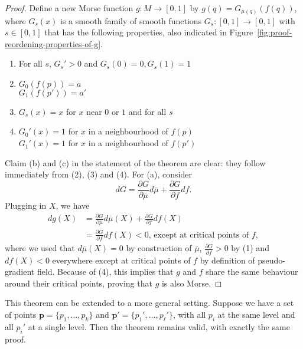 \begin{proof}
    Define a new Morse function $g: M \to  [0,1]$ by $g(q) = G_{\overline{\mu}(q)}(f(q))$, where $G_{s}(x)$ is a smooth family of smooth functions $G_s: [0,1] \to  [0,1]$ with $s \in [0,1]$ that has the following properties, also indicated in Figure~\ref{fig:proof-reordening-properties-of-g}.
    \begin{marginfigure}
        \centering
        \caption{Necessary properties of $G$ in the proof on reordering critical points are indicated in yellow.}
        \label{fig:proof-reordening-properties-of-g}
    \end{marginfigure}
    \begin{enumerate}[(1)]
        \item For all $s$, $G_s' > 0$ and $G_s(0) = 0, G_s(1) = 1$
        \item  $G_0(f(p)) = a$\\ $G_1(f(p')) = a'$
        \item  $G_s(x) = x$ for $x$ near  $0$ or  $1$ and for all $s$ 
        \item  $G_0'(x) = 1$ for $x$  in a neighbourhood of $f(p)$\\
        $G_1'(x) = 1$ for $x$  in a neighbourhood of $f(p')$
    \end{enumerate}
    Claim (b) and (c) in the statement of the theorem are clear: they follow immediately from (2), (3) and (4).
    For (a), consider
    \[
        dG = \frac{\partial G}{\partial \overline{\mu}}  d\overline{\mu} + \frac{\partial G}{\partial f}  df
    .\] 
    Plugging in $X$, we have
    \begin{align*}
        dg(X) &= \frac{\partial G}{\partial \overline{\mu}}  d\overline{\mu}(X) + \frac{\partial G}{\partial f}  df(X)\\
              &= \frac{\partial G}{\partial f}  df(X) < 0 \text{, except at critical points of $f$}
    ,\end{align*} 
    where we used that $d\overline{\mu}(X) = 0$ by construction of $\overline{\mu}$, $\frac{\partial G}{\partial f} > 0$ by (1) and $df(X) < 0$ everywhere except at critical points of $f$ by definition of pseudo-gradient field.
    Because of (4), this implies that $g$ and $f$ share the same behaviour around their critical points, proving that $g$ is also Morse.
\end{proof}

\begin{remark}
    This theorem can be extended to a more general setting. Suppose we have a set of points $\mathbf{p} = \{p_1, \ldots, p_k\}$ and $\mathbf{p}' = \{p_1', \ldots, p_\ell'\}$, with all $p_i$ at the same level and all $p_i'$ at a single level.
    Then the theorem remains valid, with exactly the same proof.
\end{remark}

